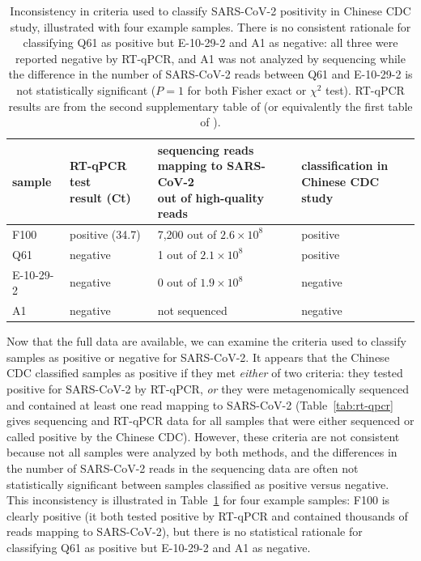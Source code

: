 \documentclass[9pt,twocolumn,twoside]{gsajnl_modified}
\begin{document}
\begin{table}
\caption{
Inconsistency in criteria used to classify SARS-CoV-2 positivity in Chinese CDC study, illustrated with four example samples.
There is no consistent rationale for classifying Q61 as positive but E-10-29-2 and A1 as negative: all three were reported negative by RT-qPCR, and A1 was not analyzed by sequencing while the difference in the number of SARS-CoV-2 reads between Q61 and E-10-29-2 is not statistically significant ($P = 1$ for both Fisher exact or $\chi^2$ test).
RT-qPCR results are from the second supplementary table of \citet{liu2023surveillance} (or equivalently the first table of \citet{liu2022surveillance}).
\label{tab:consistency}
}
{\footnotesize
\setlength{\tabcolsep}{5pt}
\renewcommand{\arraystretch}{1.3}
\begin{tabular}{llll}
\toprule
sample & \makecell[l]{RT-qPCR test \\ result (Ct)} & \makecell[l]{sequencing reads \\ mapping to SARS-CoV-2 \\ out of high-quality reads} & \makecell[l]{classification in \\ Chinese CDC study} \\
\midrule
F100 & positive (34.7) & 7,200 out of $2.6 \times 10^8$ & positive \\
Q61 & negative & 1 out of $2.1 \times 10^8$ & positive \\
E-10-29-2 & negative & 0 out of $1.9 \times 10^8$ & negative \\
A1 & negative & not sequenced & negative \\
\bottomrule
\end{tabular}
}
\end{table}

Now that the full data are available, we can examine the criteria used to classify samples as positive or negative for SARS-CoV-2.
It appears that the Chinese CDC classified samples as positive if they met \emph{either} of two criteria: they tested positive for SARS-CoV-2 by RT-qPCR, \emph{or} they were metagenomically sequenced and contained at least one read mapping to SARS-CoV-2 (Table~\ref{tab:rt-qpcr} gives sequencing and RT-qPCR data for all samples that were either sequenced or called positive by the Chinese CDC).
However, these criteria are not consistent because not all samples were analyzed by both methods, and the differences in the number of SARS-CoV-2 reads in the sequencing data are often not statistically significant between samples classified as positive versus negative.
This inconsistency is illustrated in Table~\ref{tab:consistency} for four example samples: F100 is clearly positive (it both tested positive by RT-qPCR and contained thousands of reads mapping to SARS-CoV-2), but there is no statistical rationale for classifying Q61 as positive but E-10-29-2 and A1 as negative.
\end{document}
